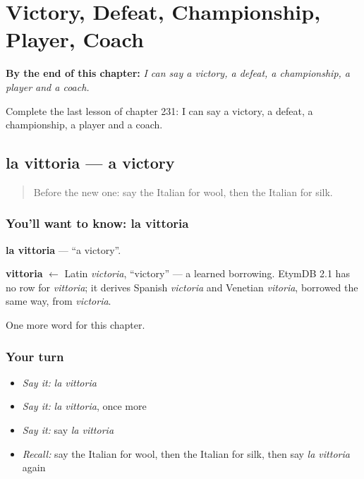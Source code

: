 
\chapter{Victory, Defeat, Championship, Player, Coach}
\label{ch:it-victory-defeat-championship-player-coach}

\begin{chapteropening}
\textbf{By the end of this chapter:} \emph{I can say a victory, a defeat, a championship, a player and a coach.}

Complete the last lesson of chapter 231: I can say a victory, a defeat, a championship, a player and a coach.
\end{chapteropening}

\section[la vittoria]{la vittoria — a victory}

\label{lesson:IT-C231-vittoria}



\begin{quote}
Before the new one: say the Italian for wool, then the Italian for silk.
\end{quote}

\subsection*{You'll want to know: la vittoria}
\textbf{la vittoria} — \textquotedblleft{}a victory\textquotedblright{}.

\begin{cousinweb}
\textbf{vittoria} $\leftarrow$ Latin \emph{victoria}, \textquotedblleft{}victory\textquotedblright{} — a learned borrowing. EtymDB 2.1 has no row for \emph{vittoria}; it derives Spanish \emph{victoria} and Venetian \emph{vitoria}, borrowed the same way, from \emph{victoria}.
\end{cousinweb}

\begin{grammarlens}[title={What you've built}]
One more word for this chapter.
\end{grammarlens}

\subsection*{Your turn}
\begin{itemize}
\raggedright
  \item \emph{Say it:} \emph{la vittoria}
  \item \emph{Say it:} \emph{la vittoria}, once more
  \item \emph{Say it:} say \emph{la vittoria}
  \item \emph{Recall:} say the Italian for wool, then the Italian for silk, then say \emph{la vittoria} again
\end{itemize}

